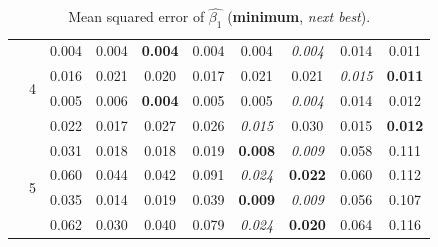 \documentclass[authoryear, review, 11pt]{elsarticle}
\begin{document}
\begin{table}
\begin{center}
{\begin{tabular}{cccccccccc}
  \cline{3-10}
   & \multirow{4}{*}{4} & 0.004 & 0.004 & \textbf{0.004} & 0.004 & 0.004 & \emph{0.004} & 0.014 & 0.011 \\ 
   &  & 0.016 & 0.021 & 0.020 & 0.017 & 0.021 & 0.021 & \emph{0.015} & \textbf{0.011} \\ 
   &  & 0.005 & 0.006 & \textbf{0.004} & 0.005 & 0.005 & \emph{0.004} & 0.014 & 0.012 \\ 
   &  & 0.022 & 0.017 & 0.027 & 0.026 & \emph{0.015} & 0.030 & 0.015 & \textbf{0.012} \\ 
  \cline{3-10}
   & \multirow{4}{*}{5} & 0.031 & 0.018 & 0.018 & 0.019 & \textbf{0.008} & \emph{0.009} & 0.058 & 0.111 \\ 
   &  & 0.060 & 0.044 & 0.042 & 0.091 & \emph{0.024} & \textbf{0.022} & 0.060 & 0.112 \\ 
   &  & 0.035 & 0.014 & 0.019 & 0.039 & \textbf{0.009} & \emph{0.009} & 0.056 & 0.107 \\ 
   &  & 0.062 & 0.030 & 0.040 & 0.079 & \emph{0.024} & \textbf{0.020} & 0.064 & 0.116 \\ 
  \end{tabular}}
\caption{Mean squared error of $\hat{\beta_1}$ (\textbf{minimum}, \emph{next best}).\label{table:X1-mse}}
		\end{center}
		\end{table}	
 
\end{document}
